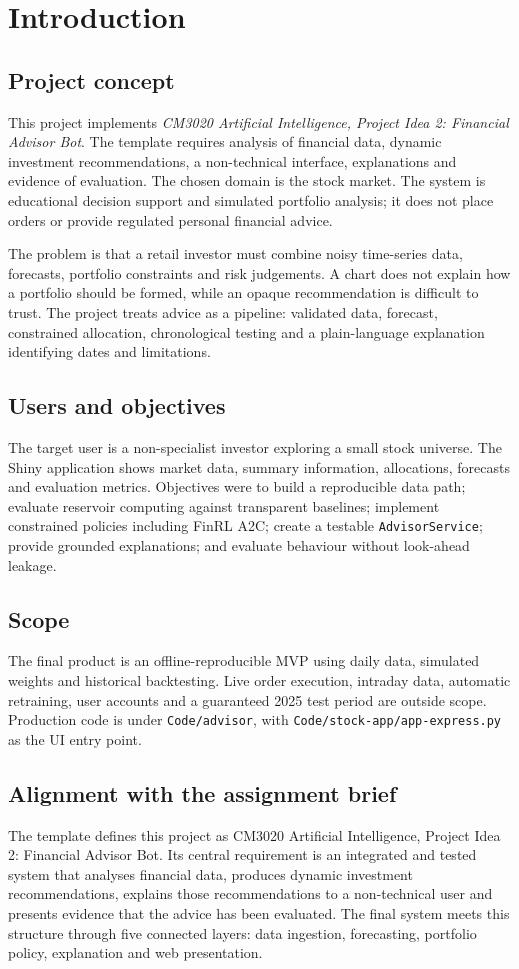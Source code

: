 \chapter{Introduction}
\section{Project concept}
This project implements \emph{CM3020 Artificial Intelligence, Project Idea 2: Financial Advisor Bot}. The template requires analysis of financial data, dynamic investment recommendations, a non-technical interface, explanations and evidence of evaluation. The chosen domain is the stock market. The system is educational decision support and simulated portfolio analysis; it does not place orders or provide regulated personal financial advice.

The problem is that a retail investor must combine noisy time-series data, forecasts, portfolio constraints and risk judgements. A chart does not explain how a portfolio should be formed, while an opaque recommendation is difficult to trust. The project treats advice as a pipeline: validated data, forecast, constrained allocation, chronological testing and a plain-language explanation identifying dates and limitations.

\section{Users and objectives}
The target user is a non-specialist investor exploring a small stock universe. The Shiny application shows market data, summary information, allocations, forecasts and evaluation metrics. Objectives were to build a reproducible data path; evaluate reservoir computing against transparent baselines; implement constrained policies including FinRL A2C; create a testable \texttt{AdvisorService}; provide grounded explanations; and evaluate behaviour without look-ahead leakage.

\section{Scope}
The final product is an offline-reproducible MVP using daily data, simulated weights and historical backtesting. Live order execution, intraday data, automatic retraining, user accounts and a guaranteed 2025 test period are outside scope. Production code is under \texttt{Code/advisor}, with \texttt{Code/stock-app/app-express.py} as the UI entry point.
\section{Alignment with the assignment brief}
The template defines this project as CM3020 Artificial Intelligence, Project Idea 2: Financial Advisor Bot. Its central requirement is an integrated and tested system that analyses financial data, produces dynamic investment recommendations, explains those recommendations to a non-technical user and presents evidence that the advice has been evaluated. The final system meets this structure through five connected layers: data ingestion, forecasting, portfolio policy, explanation and web presentation.

